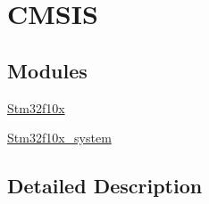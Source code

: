 \hypertarget{group___c_m_s_i_s}{}\section{C\+M\+S\+IS}
\label{group___c_m_s_i_s}
\subsection*{Modules}
\begin{DoxyCompactItemize}
\item 
\mbox{\hyperlink{group__stm32f10x}{Stm32f10x}}
\item 
\mbox{\hyperlink{group__stm32f10x__system}{Stm32f10x\+\_\+system}}
\end{DoxyCompactItemize}


\subsection{Detailed Description}
